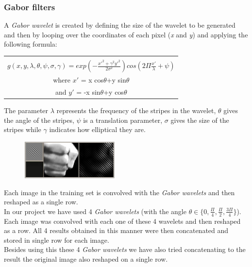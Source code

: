 \documentclass[a4paper, 11pt, twocolumn]{article}
\begin{document}
		\subsubsection{Gabor filters}
		A \emph{Gabor wavelet} is created by defining the size of the wavelet to be generated and then by looping over the coordinates of each pixel (\emph{x} and \emph{y}) and applying the following formula:\\
		\begin{table}[!htbp]
		\begin{tabular}{| c |}
			\hline\\
	 		\emph{$ g(x,y,\lambda,\theta,\psi,\sigma,\gamma) = exp(-\frac{x\prime^2+\gamma^2y\prime^2}{2\sigma^2})cos(2\Pi\frac{x\prime}{\lambda}+\psi)$}\\[10px]
			where $x\prime$ = x cos$\theta$+y sin$\theta$\\
			and $y\prime$ = -x sin$\theta$+y cos$\theta$\\[2px]
			\hline
		\end{tabular}
		\end{table}

		The parameter $\lambda$ represents the frequency of the stripes in the wavelet, $\theta$ gives the angle of the stripes, $\psi$ is a translation parameter, $\sigma$ gives the size of the stripes while $\gamma$ indicates how elliptical they are.\\  
		\begin{figure}[!hbtp]
		   \centering
		   \includegraphics[width=0.45\textwidth]{gabor.png}
	   	\end{figure}	
		\hspace*{10px}Each image in the training set is convolved with the \emph{Gabor wavelets} and then reshaped as a single row.\\
		\hspace*{10px}In our project we have used 4 \emph{Gabor wavelets} (with the angle $\theta \in \{0, \frac{\Pi}{4}, \frac{\Pi}{2}, \frac{3\Pi}{4}\}$). Each image was convolved with each one of these 4 wavelets and then reshaped as a row. All 4 results obtained in this manner were then concatenated and stored in single row for each image.\\
		\hspace*{10px}Besides using this these 4 \emph{Gabor wavelets} we have also tried concatenating to the result the original image also reshaped on a single row.
\end{document}
